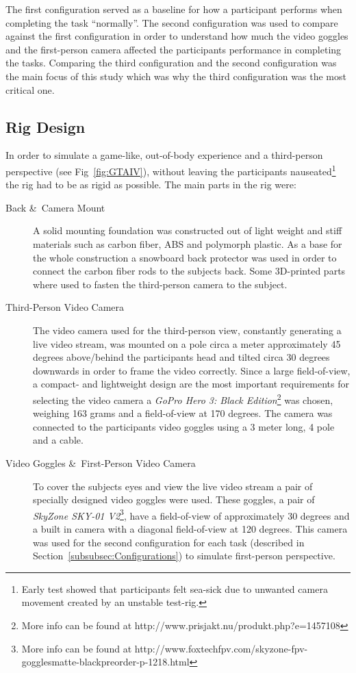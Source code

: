 \documentclass[runningheads,a4paper,oribibl]{llncs}
\begin{document}
The first configuration served as a baseline for how a participant performs when completing the task ``normally''. The second configuration was used to compare against the first configuration in order to understand how much the video goggles and the first-person camera affected the participants performance in completing the tasks. Comparing the third configuration and the second configuration was the main focus of this study which was why the third configuration was the most critical one.










\subsection{Rig Design}
In order to simulate a game-like, out-of-body experience and a third-person perspective (see Fig~\ref{fig:GTAIV}), without leaving the participants nauseated\footnote{Early test showed that participants felt sea-sick due to unwanted camera movement created by an unstable test-rig.} the rig had to be as rigid as possible. The main parts in the rig were:
\begin{description}
	\item[Back \&\ Camera Mount] A solid mounting foundation was constructed out of light weight and stiff materials such as carbon fiber, ABS and polymorph plastic. As a base for the whole construction a snowboard back protector was used in order to connect the carbon fiber rods to the subjects back. Some 3D-printed parts where used to fasten the third-person camera to the subject.

	\item[Third-Person Video Camera] The video camera used for the third-person view, constantly generating a live video stream, was mounted on a pole circa a meter approximately 45 degrees above/behind the participants head and tilted circa 30 degrees downwards in order to frame the video correctly. Since a large field-of-view, a compact- and lightweight design are the most important requirements for selecting the video camera a \emph{GoPro Hero 3: Black Edition}\footnote{More info can be found at http://www.prisjakt.nu/produkt.php?e=1457108} was chosen, weighing 163 grams and a field-of-view at 170 degrees. The camera was connected to the participants video goggles using a 3 meter long, 4 pole and a cable.

	\item[Video Goggles \&\ First-Person Video Camera] To cover the subjects eyes and view the live video stream a pair of specially designed video goggles were used. These goggles, a pair of \emph{SkyZone SKY-01 V2}\footnote{More info can be found at http://www.foxtechfpv.com/skyzone-fpv-gogglesmatte-blackpreorder-p-1218.html}, have a field-of-view of approximately 30 degrees and a built in camera with a diagonal field-of-view at 120 degrees. This camera was used for the second configuration for each task (described in Section~\ref{subsubsec:Configurations}) to simulate first-person perspective.
\end{description}
\end{document}
